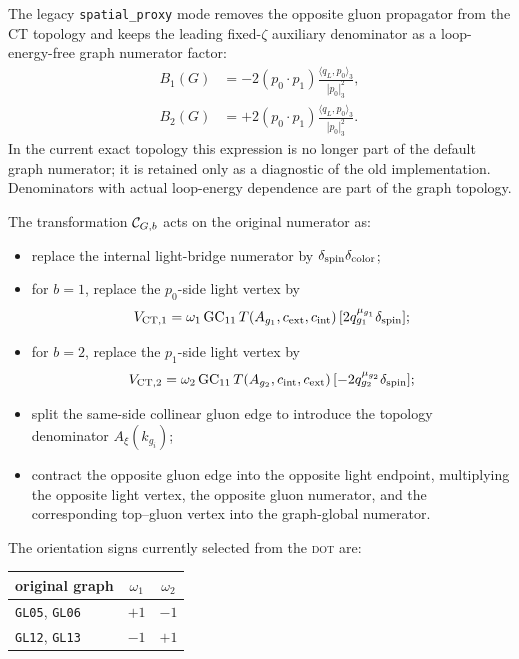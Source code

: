 \documentclass[11pt]{article}
\newcommand{\DOT}{\textsc{dot}}
\begin{document}
The legacy \texttt{spatial\_proxy} mode removes the opposite gluon propagator
from the CT topology and keeps the leading fixed-\(\zeta\) auxiliary
denominator as a loop-energy-free graph numerator factor:
\begin{align}
  B_1(G)
  &=
  -2(p_0\cdot p_1)
  \frac{\langle q_L,p_0\rangle_3}{|p_0|_3^2},
  \\
  B_2(G)
  &=
  +2(p_0\cdot p_1)
  \frac{\langle q_L,p_0\rangle_3}{|p_0|_3^2}.
  \label{eq:spatialProxy}
\end{align}
In the current exact topology this expression is no longer part of the default
graph numerator; it is retained only as a diagnostic of the old implementation.
Denominators with actual loop-energy dependence are part of the graph topology.

The transformation \({\cal C}_{G,b}\) acts on the original numerator as:
\begin{itemize}[leftmargin=2em]
  \item replace the internal light-bridge numerator by
        \(\delta_{\rm spin}\delta_{\rm color}\);
  \item for \(b=1\), replace the \(p_0\)-side light vertex by
        \[
          V_{{\rm CT},1}
          =
          \omega_1\,{\rm GC}_{11}\,
          T(A_{g_1},c_{\rm ext},c_{\rm int})\,
          [2q_{g_1}^{\mu_{g_1}}\delta_{\rm spin}];
        \]
  \item for \(b=2\), replace the \(p_1\)-side light vertex by
        \[
          V_{{\rm CT},2}
          =
          \omega_2\,{\rm GC}_{11}\,
          T(A_{g_2},c_{\rm int},c_{\rm ext})\,
          [-2q_{g_2}^{\mu_{g_2}}\delta_{\rm spin}];
        \]
  \item split the same-side collinear gluon edge to introduce the topology
        denominator \(A_\xi(k_{g_i})\);
  \item contract the opposite gluon edge into the opposite light endpoint,
        multiplying the opposite light vertex, the opposite gluon numerator,
        and the corresponding top--gluon vertex into the graph-global
        numerator.
\end{itemize}
The orientation signs currently selected from the \DOT{} are:
\begin{center}
\begin{tabular}{lcc}
\toprule
original graph & \(\omega_1\) & \(\omega_2\)\\
\midrule
\texttt{GL05}, \texttt{GL06} & \(+1\) & \(-1\)\\
\texttt{GL12}, \texttt{GL13} & \(-1\) & \(+1\)\\
\bottomrule
\end{tabular}
\end{center}
\end{document}
